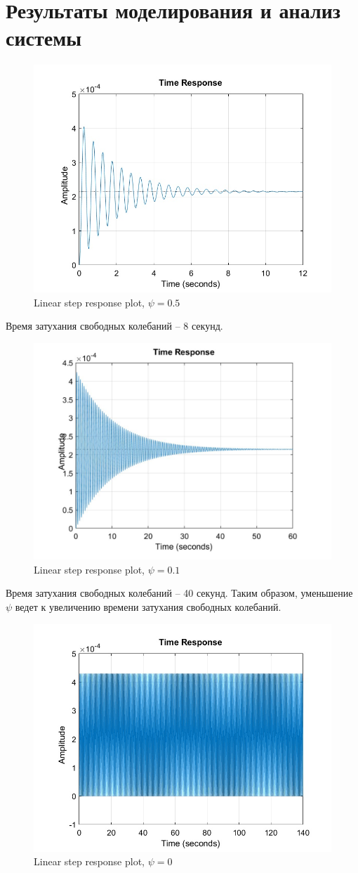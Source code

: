 \documentclass{article}
\begin{document}
	\section*{Результаты моделирования и анализ системы}
	\begin{figure}[H]
		\centering
		\includegraphics[width=0.7\linewidth]{graph2}
		\caption{Linear step response plot, $\psi = 0.5$}
		\label{fig:graph1}
	\end{figure}
	Время затухания свободных колебаний -- 8 секунд.
	\begin{figure}[H]
		\centering
		\includegraphics[width=0.7\linewidth]{graph1}
		\caption{Linear step response plot, $\psi = 0.1$}
		\label{fig:graph1}
	\end{figure}
	Время затухания свободных колебаний -- 40 секунд.
	Таким образом, уменьшение $\psi$ ведет к увеличению времени затухания свободных колебаний.
	\begin{figure}[H]
		\centering
		\includegraphics[width=0.7\linewidth]{graph3}
		\caption{Linear step response plot, $\psi = 0$}
		\label{fig:graph3}
	\end{figure}
\end{document}
